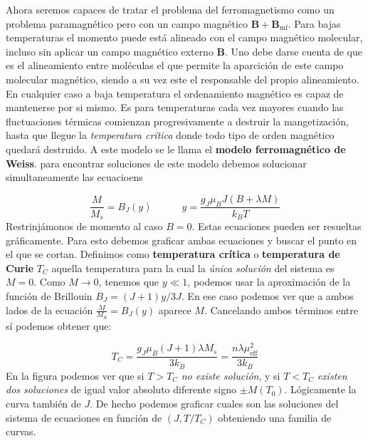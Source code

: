 \documentclass[12pt,a4paper]{book}
\numberwithin{equation}{section}
\numberwithin{figure}{section}
\newcommand{\tquad}{\quad \quad \quad}
\newcommand{\eff}{\mathrm{eff}}
\newcommand{\mf}{\mathrm{mf}}
\newcommand{\Bn}{\mathbf{B}}
\begin{document}
Ahora seremos capaces de tratar el problema del ferromagnetismo como un problema paramagnético pero con un campo magnético $\Bn+\Bn_\mf$. Para bajas temperaturas el momento puede está alineado con el campo magnético molecular, incluso sin aplicar un campo magnético externo $\Bn$. Uno debe darse cuenta de que es el alineamiento entre moléculas el que permite la aparcición de este campo molecular magnético, siendo a su vez este el responsable del propio alineamiento. \\

En cualquier caso a baja temperatura el ordenamiento magnético es capaz de mantenerse por si mismo. Es para temperaturas cada vez mayores cuando las fluctuaciones térmicas comienzan progresivamente a destruir la mangetización, hasta que llegue la \textit{temperatura crítica} donde todo tipo de orden magnético quedará destruido. A este modelo se le llama el \textbf{modelo ferromagnético de Weiss}. para encontrar soluciones de este modelo debemos solucionar simultaneamente las ecuacioens 

\begin{equation}
    \frac{M}{M_s} = B_J (y) \tquad y = \frac{g_J \mu_B J (B+\lambda M)}{k_B T} \label{Ec:05-01-005}
\end{equation}
Restrinjámonos de momento al caso $B=0$. Estas ecuaciones pueden ser resueltas gráficamente. Para esto debemos graficar ambas ecuaciones y buscar el punto en el que se cortan. Definimos como \textbf{temperatura crítica} o \textbf{temperatura de Curie} $T_C$ aquella temperatura para la cual la \textit{única solución} del sistema es $M=0$. Como $M\rightarrow0$, tenemos que $y\ll 1$, podemos usar la aproximación de la función de Brillouin $B_J = (J+1)y/3J$. En ese caso podemos ver que a ambos lados de la ecuación $\frac{M}{M_S}=B_J(y)$ aparece $M$. Cancelando ambos términos entre sí podemos obtener  que:

\begin{equation}
    T_C= \frac{g_J \mu_B (J+1) \lambda M_s}{3 k_B} = \frac{n \lambda \mu_\eff^2}{3 k_B}
\end{equation}
En la figura podemos ver que si $T>T_C$ \textit{no existe solución}, y si $T<T_C$ \textit{existen dos soluciones} de igual valor absoluto diferente signo $\pm M(T_0)$. Lógicamente la curva también de $J$. De hecho podemos graficar cuales son las soluciones del sistema de ecuaciones en función de $(J,T/T_C)$ obteniendo una familia de curvas. \\
\end{document}
